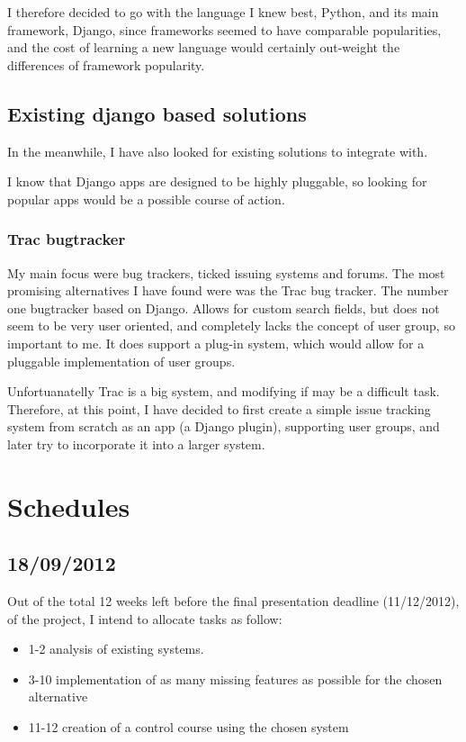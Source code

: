 \documentclass[12pt]{article}
\begin{document}
I therefore decided to go with the language I knew best, Python, and its main framework,
Django, since frameworks
seemed to have comparable popularities, and the cost of learning a new language
would certainly out-weight the differences of framework popularity.

\subsection{Existing django based solutions}

In the meanwhile, I have also looked for existing solutions to integrate with.

I know that Django apps are designed to be highly pluggable,
so looking for popular apps would be a possible course of action.

\subsubsection{Trac bugtracker}

My main focus were bug trackers, ticked issuing systems and forums. The most promising alternatives I have found were was the Trac bug tracker. The number one bugtracker based on Django. Allows for custom search fields, but does not seem to be very user oriented, and completely lacks the concept of user group, so important to me. It does support a plug-in system, which would allow for a pluggable implementation of user groups.

Unfortuanatelly Trac is a big system, and modifying if may be a difficult task. Therefore, at this point, I have decided to first create a simple issue tracking system from scratch as an app (a Django plugin), supporting user groups, and later try to incorporate it into a larger system.

\section{Schedules} \label{schedules}

\subsection{18/09/2012}  \label{2012-09-18}

Out of the total 12 weeks left before the final presentation deadline (11/12/2012), of the project, I intend to allocate tasks as follow:

\begin{itemize}
  \item 1-2 analysis of existing systems.
  \item 3-10 implementation of as many missing features as possible for the chosen alternative
  \item 11-12 creation of a control course using the chosen system
\end{itemize}
\end{document}
